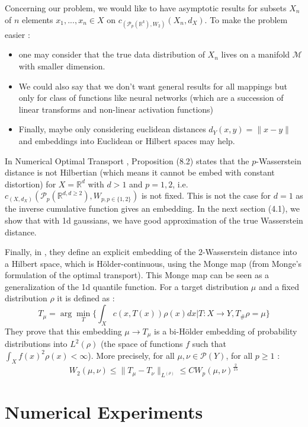 \documentclass{article}
\begin{document}
Concerning our problem, we would like to have asymptotic results for subsets $X_n$ of $n$ elements $x_1, ..., x_n \in X$ on $c_{(\mathcal{P}_p(\mathbb{R}^k), W_2)}(X_n, d_X)$. To make the problem easier :
\begin{itemize}
	\item one may consider that the true data distribution of $X_n$ lives on a manifold $\mathcal{M}$ with smaller dimension.
	\item We could also say that we don't want general results for all mappings but only for class of functions like neural networks (which are a succession of linear transforms and non-linear activation functions)
	\item Finally, maybe only considering euclidean distances $d_Y(x, y) = \| x - y \|$ and embeddings into Euclidean or Hilbert spaces may help.
\end{itemize}

In Numerical Optimal Transport \cite{peyre2019computational}, Proposition (8.2) states that the $p$-Wasserstein distance is not Hilbertian (which means it cannot be embed with constant distortion) for $X = \mathbb{R}^d$ with $d > 1$ and $p=1, 2$, i.e. $c_{(X, d_X)}(\mathcal{P}_p(\mathbb{R}^{d, d \geq 2}), W_{p, p \in \{1, 2\}})$ is not fixed. This is not the case for $d = 1$ as the inverse cumulative function gives an embedding. In the next section (4.1), we show that with 1d gaussians, we have good approximation of the true Wasserstein distance.

Finally, in \cite{merigot2019quantitative}, they define an explicit embedding of the $2$-Wasserstein distance into a Hilbert space, which is Hölder-continuous, using the Monge map (from Monge's formulation of the optimal transport). This Monge map can be seen as a generalization of the 1d quantile function. For a target distribution $\mu$ and a fixed distribution $\rho$ it is defined as :
$$
T_{\mu} = \arg \min_T \{ \int_X c(x, T(x)) \rho(x)dx| T: X \rightarrow Y, T_{\#} \rho = \mu\}
$$
They prove that this embedding $\mu \rightarrow T_{\mu}$ is a bi-Hölder embedding of probability distributions into $L^2(\rho)$ (the space of functions $f$ such that $\int_X f(x)^2 \rho(x) < \infty$). More precisely, for all $\mu, \nu \in \mathcal{P}(Y)$, for all $p \geq 1$ :
$$
W_2(\mu, \nu) \leq \| T_{\mu} - T_{\nu} \|_{L^(\rho)} \leq CW_p(\mu, \nu)^{\frac{2}{15}}
$$
 
\section{Numerical Experiments}
\end{document}
